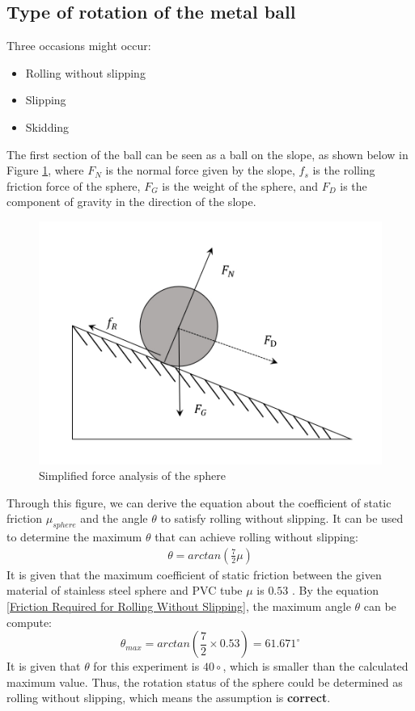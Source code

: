\documentclass[conference]{IEEEtran}
\begin{document}
    \subsection{Type of rotation of the metal ball}
Three occasions might occur:
\begin{itemize}
    \item Rolling without slipping
    \item Slipping
    \item Skidding
\end{itemize}
The first section of the ball can be seen as a ball on the slope, as shown below in Figure \ref{simplevr}, where $F_N$ is the normal force given by the slope, $f_s$ is the rolling friction force of the sphere, $F_G$ is the weight of the sphere, and $F_D$ is the component of gravity in the direction of the slope.
\begin{figure}[H]
    \centering
    \includegraphics[width=0.5\linewidth]{simplized_rolling_resistance.png}
    \caption{Simplified force analysis of the sphere}
    \label{simplevr}
\end{figure}
Through this figure, we can derive the equation about the coefficient of static friction $\mu_{sphere}$ and the angle $\theta$ to satisfy rolling without slipping. It can be used to determine the maximum $\theta$ that can achieve rolling without slipping:
\begin{equation}\label{Friction Required for Rolling Without Slipping}
\begin{aligned}
    \theta = arctan(\frac{7}{2}\mu)
\end{aligned}
\end{equation}
It is given that the maximum coefficient of static friction between the given material of stainless steel sphere and PVC tube $\mu$ is $0.53$ \cite{MechGuru}. By the equation \ref{Friction Required for Rolling Without Slipping}, the maximum angle $\theta$ can be compute:
\begin{equation}
    \theta_{max} = arctan(\frac{7}{2}\times0.53) = 61.671^\circ
\end{equation}
It is given that $\theta$ for this experiment is $40\circ$, which is smaller than the calculated maximum value. Thus, the rotation status of the sphere could be determined as rolling without slipping, which means the assumption is \textbf{correct}.
\end{document}
